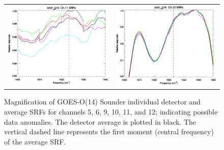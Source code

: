\begin{figure}[htp]
\begin{tabular}{c c}
    \includegraphics[scale=0.5]{graphics/zoom_anomaly/sndr_g14.ch11.srf.eps} &
    \includegraphics[scale=0.5]{graphics/zoom_anomaly/sndr_g14.ch12.srf.eps}
  \end{tabular}
  \caption{Magnification of GOES-O(14) Sounder individual detector and average SRFs for channels 5, 6, 9, 10, 11, and 12; indicating possible data anomalies. The detector average is plotted in black. The vertical dashed line represents the first moment (central frequency) of the average SRF.}
  \label{fig:sndr_g14.zoom_anomaly}
\end{figure}





